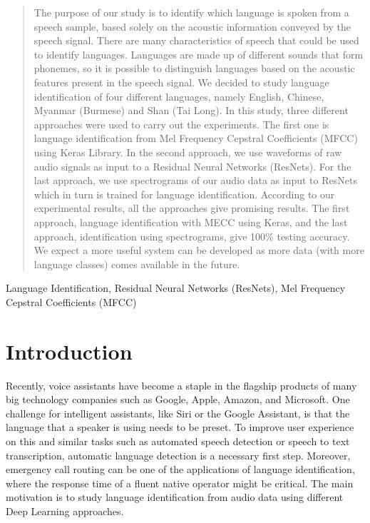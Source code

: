 \documentclass[conference]{IEEEtran}
\begin{document}
\begin{abstract}
The purpose of our study is to identify which language is spoken from a speech sample, based solely on the acoustic information conveyed by the speech signal. There are many characteristics of speech that could be used to identify languages. Languages are made up of different sounds that form phonemes, so it is possible to distinguish languages based on the acoustic features present in the speech signal. We decided to study language identification of four different languages, namely English, Chinese, Myanmar (Burmese) and Shan (Tai Long). In this study, three different approaches were used to carry out the experiments. The first one is language identification from Mel Frequency Cepstral Coefficients (MFCC) using Keras Library. In the second approach, we use waveforms of raw audio signals as input to a Residual Neural Networks (ResNets). For the last approach, we use spectrograms of our audio data as input to ResNets which in turn is trained for language identification. According to our experimental results, all the approaches give promising results. The first approach, language identification with MECC using Keras, and the last approach, identification using spectrograms, give 100\% testing accuracy. We expect a more useful system can be developed as more data (with more language classes) comes available in the future.
\end{abstract}

\begin{IEEEkeywords}
Language Identification, Residual Neural Networks (ResNets), Mel Frequency Cepstral Coefficients (MFCC) 
\end{IEEEkeywords}

\section{Introduction}
Recently, voice assistants have become a staple in the flagship products of many big technology companies such as Google, Apple, Amazon, and Microsoft. One challenge for intelligent assistants, like Siri or the Google Assistant, is that the language that a speaker is using needs to be preset. To improve user experience on this and similar tasks such as automated speech detection or speech to text transcription, automatic language detection is a necessary first step. Moreover, emergency call routing can be one of the applications of language identification, where the response time of a fluent native operator might be critical. The main motivation is to study language identification from audio data using different Deep Learning approaches.
\end{document}

